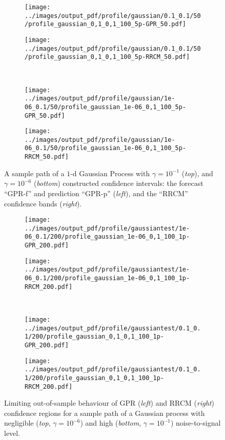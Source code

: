 \documentclass[10pt, conference, compsocconf]{IEEEtran}
\begin{document}
\begin{figure}%
  \centering
  \begin{subfigure}[b]{0.5\linewidth}
    \texttt{[image: ../images/output\_pdf/profile/gaussian/0.1\_0.1/50/profile\_gaussian\_0,1\_0,1\_100\_5p-GPR\_50.pdf]}
  \end{subfigure}%
  \begin{subfigure}[b]{0.5\linewidth}
    \texttt{[image: ../images/output\_pdf/profile/gaussian/0.1\_0.1/50/profile\_gaussian\_0,1\_0,1\_100\_5p-RRCM\_50.pdf]}
  \end{subfigure}\\
  \begin{subfigure}[b]{0.5\linewidth}
    \texttt{[image: ../images/output\_pdf/profile/gaussian/1e-06\_0.1/50/profile\_gaussian\_1e-06\_0,1\_100\_5p-GPR\_50.pdf]}
  \end{subfigure}%
  \begin{subfigure}[b]{0.5\linewidth}
    \texttt{[image: ../images/output\_pdf/profile/gaussian/1e-06\_0.1/50/profile\_gaussian\_1e-06\_0,1\_100\_5p-RRCM\_50.pdf]}
  \end{subfigure}%
  \caption{A sample path of a $1$-d Gaussian Process with $\gamma=10^{-1}$ (\textit{top}),
  and $\gamma=10^{-6}$ (\textit{bottom}) constructed confidence intervals: the forecast
  ``GPR-f'' and prediction ``GPR-p'' (\textit{left}), and the ``RRCM'' confidence
  bands (\textit{right}).}
  \label{fig:gauss_1d_prof_gpr_conf}
\end{figure}

\begin{figure}%
  \centering
  \begin{subfigure}[b]{0.5\linewidth}
    \texttt{[image: ../images/output\_pdf/profile/gaussiantest/1e-06\_0.1/200/profile\_gaussian\_1e-06\_0,1\_100\_1p-GPR\_200.pdf]}
  \end{subfigure}%
  \begin{subfigure}[b]{0.5\linewidth}
    \texttt{[image: ../images/output\_pdf/profile/gaussiantest/1e-06\_0.1/200/profile\_gaussian\_1e-06\_0,1\_100\_1p-RRCM\_200.pdf]}
  \end{subfigure}\\
  \begin{subfigure}[b]{0.5\linewidth}
    \texttt{[image: ../images/output\_pdf/profile/gaussiantest/0.1\_0.1/200/profile\_gaussian\_0,1\_0,1\_100\_1p-GPR\_200.pdf]}
  \end{subfigure}%
  \begin{subfigure}[b]{0.5\linewidth}
    \texttt{[image: ../images/output\_pdf/profile/gaussiantest/0.1\_0.1/200/profile\_gaussian\_0,1\_0,1\_100\_1p-RRCM\_200.pdf]}
  \end{subfigure}
  \caption{Limiting out-of-sample behaviour of GPR (\textit{left}) and RRCM (\textit{right})
    confidence regions for a sample path of a Gaussian process with negligible (\textit{top},
    $\gamma=10^{-6}$) and high (\textit{bottom}, $\gamma=10^{-1}$) noise-to-signal level.}
  \label{fig:limit_1d_ci_size}
\end{figure}
\end{document}
